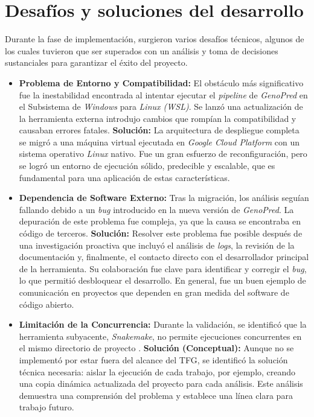 \section{Desafíos y soluciones del desarrollo}
Durante la fase de implementación, surgieron varios desafíos técnicos, algunos de los cuales tuvieron que ser superados con un análisis y toma de decisiones sustanciales para garantizar el éxito del proyecto.

\begin{itemize}
    \item \textbf{Problema de Entorno y Compatibilidad:} El obstáculo más significativo fue la inestabilidad encontrada al intentar ejecutar el \textit{pipeline} de \textit{GenoPred} en el Subsistema de \textit{Windows} para \textit{Linux (WSL)}. Se lanzó una actualización de la herramienta externa introdujo cambios que rompían la compatibilidad y causaban errores fatales.
    \newline
    \textbf{Solución:} La arquitectura de despliegue completa se migró a una máquina virtual ejecutada en \textit{Google Cloud Platform} con un sistema operativo \textit{Linux} nativo. Fue un gran esfuerzo de reconfiguración, pero se logró un entorno de ejecución sólido, predecible y escalable, que es fundamental para una aplicación de estas características.
    
    \item \textbf{Dependencia de Software Externo:} Tras la migración, los análisis seguían fallando debido a un \textit{bug} introducido en la nueva versión de \textit{GenoPred}. La depuración de este problema fue compleja, ya que la causa se encontraba en código de terceros.
        \newline
        \textbf{Solución:} Resolver este problema fue posible después de una investigación proactiva que incluyó el análisis de \textit{logs}, la revisión de la documentación y, finalmente, el contacto directo con el desarrollador principal de la herramienta. Su colaboración fue clave para identificar y corregir el \textit{bug}, lo que permitió desbloquear el desarrollo. En general, fue un buen ejemplo de comunicación en proyectos que dependen en gran medida del software de código abierto.
        
    \item \textbf{Limitación de la Concurrencia:} Durante la validación, se identificó que la herramienta subyacente, \textit{Snakemake}, no permite ejecuciones concurrentes en el mismo directorio de proyecto \cite{snakemake}.
        \newline
        \textbf{Solución (Conceptual):} Aunque no se implementó por estar fuera del alcance del TFG, se identificó la solución técnica necesaria: aislar la ejecución de cada trabajo, por ejemplo, creando una copia dinámica actualizada del proyecto para cada análisis. Este análisis demuestra una comprensión del problema y establece una línea clara para trabajo futuro.
    
\end{itemize}

